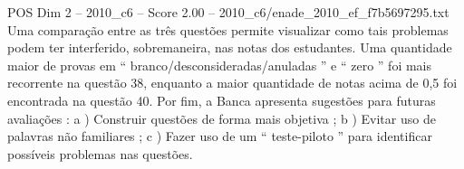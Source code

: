 \begin{textsample}{POS Dim 2 – 2010\_c6 – Score 2.00 – 2010\_c6/enade\_2010\_ef\_f7b5697295.txt}
Uma comparação entre as três questões permite visualizar como tais problemas podem ter interferido, sobremaneira, nas notas dos estudantes.
Uma quantidade maior de provas em “ branco/desconsideradas/anuladas ” e “ zero ” foi mais recorrente na questão 38, enquanto a maior quantidade de notas acima de 0,5 foi encontrada na questão 40.
Por fim, a Banca apresenta sugestões para futuras avaliações : a ) Construir questões de forma mais objetiva ; b ) Evitar uso de palavras não familiares ; c ) Fazer uso de um “ teste-piloto ” para identificar possíveis problemas nas questões.

\end{textsample}
